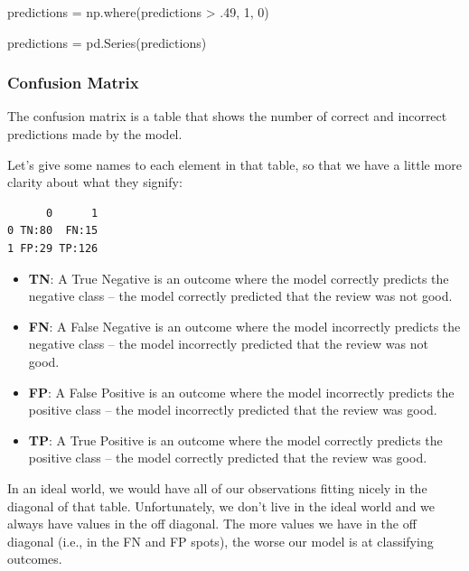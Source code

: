 \documentclass[
  letterpaper,
]{krantz}
\newenvironment{Shaded}{}{}
\newcommand{\DecValTok}[1]{\textcolor[rgb]{0.25,0.63,0.44}{#1}}
\newcommand{\FloatTok}[1]{\textcolor[rgb]{0.25,0.63,0.44}{#1}}
\newcommand{\NormalTok}[1]{#1}
\newcommand{\OperatorTok}[1]{\textcolor[rgb]{0.40,0.40,0.40}{#1}}
\begin{document}
\begin{Shaded}
\begin{Highlighting}[]
\NormalTok{predictions }\OperatorTok{=}\NormalTok{ np.where(predictions }\OperatorTok{\textgreater{}} \FloatTok{.49}\NormalTok{, }\DecValTok{1}\NormalTok{, }\DecValTok{0}\NormalTok{)}

\NormalTok{predictions }\OperatorTok{=}\NormalTok{ pd.Series(predictions)}
\end{Highlighting}
\end{Shaded}

\subsubsection{Confusion Matrix}\label{confusion-matrix}

The confusion matrix is a table that shows the number of correct and
incorrect predictions made by the model.

Let's give some names to each element in that table, so that we have a
little more clarity about what they signify:

\begin{verbatim}
      0      1
0 TN:80  FN:15
1 FP:29 TP:126
\end{verbatim}

\begin{itemize}
\item
  \textbf{TN}: A True Negative is an outcome where the model correctly
  predicts the negative class -- the model correctly predicted that the
  review was not good.
\item
  \textbf{FN}: A False Negative is an outcome where the model
  incorrectly predicts the negative class -- the model incorrectly
  predicted that the review was not good.
\item
  \textbf{FP}: A False Positive is an outcome where the model
  incorrectly predicts the positive class -- the model incorrectly
  predicted that the review was good.
\item
  \textbf{TP}: A True Positive is an outcome where the model correctly
  predicts the positive class -- the model correctly predicted that the
  review was good.
\end{itemize}

In an ideal world, we would have all of our observations fitting nicely
in the diagonal of that table. Unfortunately, we don't live in the ideal
world and we always have values in the off diagonal. The more values we
have in the off diagonal (i.e., in the FN and FP spots), the worse our
model is at classifying outcomes.
\end{document}
